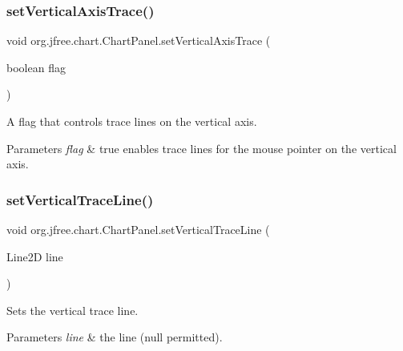 \subsubsection{\texorpdfstring{set\+Vertical\+Axis\+Trace()}{setVerticalAxisTrace()}}
{\footnotesize\ttfamily void org.\+jfree.\+chart.\+Chart\+Panel.\+set\+Vertical\+Axis\+Trace (\begin{DoxyParamCaption}\item[{boolean}]{flag }\end{DoxyParamCaption})}

A flag that controls trace lines on the vertical axis.


\begin{DoxyParams}{Parameters}
{\em flag} & {\ttfamily true} enables trace lines for the mouse pointer on the vertical axis. \\
\hline
\end{DoxyParams}
\mbox{\label{classorg_1_1jfree_1_1chart_1_1_chart_panel_a53ac943a87b0d5c177ed911a7df69a72}} 
\subsubsection{\texorpdfstring{set\+Vertical\+Trace\+Line()}{setVerticalTraceLine()}}
{\footnotesize\ttfamily void org.\+jfree.\+chart.\+Chart\+Panel.\+set\+Vertical\+Trace\+Line (\begin{DoxyParamCaption}\item[{Line2D}]{line }\end{DoxyParamCaption})\hspace{0.3cm}{\ttfamily [protected]}}

Sets the vertical trace line.


\begin{DoxyParams}{Parameters}
{\em line} & the line ({\ttfamily null} permitted). \\
\hline
\end{DoxyParams}
\mbox{\label{classorg_1_1jfree_1_1chart_1_1_chart_panel_a89fcf9fe09158f887a38f2cf4af15b42}} 

